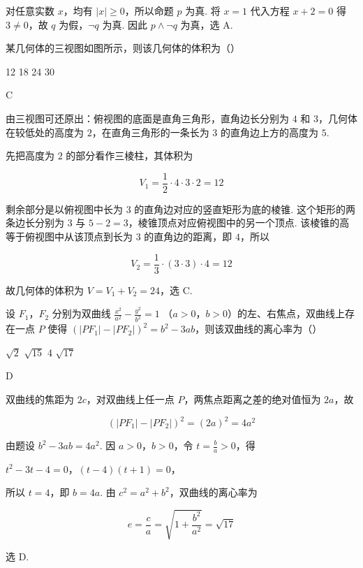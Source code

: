 \begin{solution}
对任意实数 \(x\)，均有 \(|x|\geqslant0\)，所以命题 \(p\) 为真. 将 \(x=1\) 代入方程 \(x+2=0\) 得 \(3\ne0\)，故 \(q\) 为假，\(\neg q\) 为真. 因此 \(p\wedge\neg q\) 为真，选 A.
\end{solution}

\begin{problem}
某几何体的三视图如图所示，则该几何体的体积为（\quad）


\choices
    {12}
    {18}
    {24}
    {30}
\end{problem}

\begin{answer}
C
\end{answer}

\begin{solution}
由三视图可还原出：俯视图的底面是直角三角形，直角边长分别为 \(4\) 和 \(3\)，几何体在较低处的高度为 \(2\)，在直角三角形的一条长为 \(3\) 的直角边上方的高度为 \(5\).

先把高度为 \(2\) 的部分看作三棱柱，其体积为

\[
V_1=\frac12\cdot4\cdot3\cdot2=12
\]

剩余部分是以俯视图中长为 \(3\) 的直角边对应的竖直矩形为底的棱锥. 这个矩形的两条边长分别为 \(3\) 与 \(5-2=3\)，棱锥顶点对应俯视图中的另一个顶点. 该棱锥的高等于俯视图中从该顶点到长为 \(3\) 的直角边的距离，即 \(4\)，所以

\[
V_2=\frac13\cdot(3\cdot3)\cdot4=12
\]

故几何体的体积为 \(V=V_1+V_2=24\)，选 C.
\end{solution}

\begin{problem}
设 \(F_{1}\)，\(F_{2}\) 分别为双曲线 \(\frac{x^{2}}{a^{2}} - \frac{y^{2}}{b^{2}} = 1 \) （\(a > 0\)，\(b > 0\)）的左、右焦点，双曲线上存在一点 \(P\) 使得 \((|PF_{1}| - |PF_{2}|)^{2} = b^{2} - 3ab\)，则该双曲线的离心率为（\quad）

\choices
    {\(\sqrt{2}\)}
    {\(\sqrt{15}\)}
    {4}
    {\(\sqrt{17}\)}
\end{problem}

\begin{answer}
D
\end{answer}

\begin{solution}
双曲线的焦距为 \(2c\)，对双曲线上任一点 \(P\)，两焦点距离之差的绝对值恒为 \(2a\)，故

\[
(|PF_1|-|PF_2|)^2=(2a)^2=4a^2
\]

由题设 \(b^2-3ab=4a^2\). 因 \(a>0\)，\(b>0\)，令 \(t=\frac ba>0\)，得

\(t^2-3t-4=0\)，\((t-4)(t+1)=0\)，

所以 \(t=4\)，即 \(b=4a\). 由 \(c^2=a^2+b^2\)，双曲线的离心率为

\[
e=\frac ca=\sqrt{1+\frac{b^2}{a^2}}=\sqrt{17}
\]

选 D.
\end{solution}


